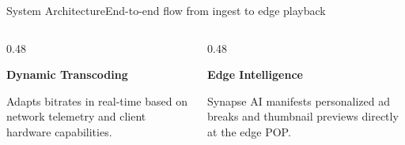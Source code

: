 \documentclass[aspectratio=169,11pt]{beamer}
\begin{document}
\begin{frame}{System Architecture}{End-to-end flow from ingest to edge playback}
  \vspace{4pt}
  \begin{columns}[T]
    \begin{column}{0.48\textwidth}
      \begin{tcolorbox}[keynotecard]
        {\small\bfseries\color{accentblue}\faCheckCircle\quad Dynamic Transcoding} \par
        {\tiny\color{textmuted} Adapts bitrates in real-time based on network telemetry and client hardware capabilities.}
      \end{tcolorbox}
    \end{column}
    \begin{column}{0.48\textwidth}
      \begin{tcolorbox}[keynotecard]
        {\small\bfseries\color{accentblue}\faCheckCircle\quad Edge Intelligence} \par
        {\tiny\color{textmuted} Synapse AI manifests personalized ad breaks and thumbnail previews directly at the edge POP.}
      \end{tcolorbox}
    \end{column}
  \end{columns}
\end{frame}
\end{document}
